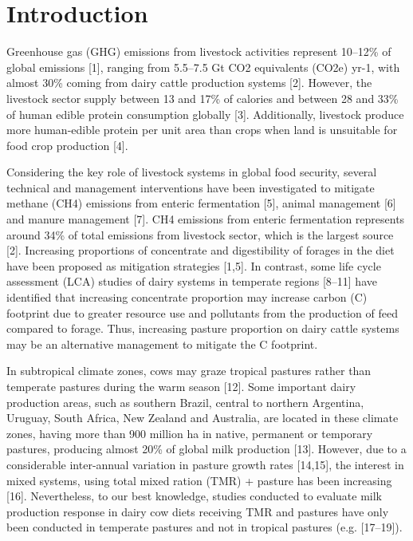 \documentclass[11pt,a4paper]{article}
\begin{document}
\section{Introduction}

Greenhouse gas (GHG) emissions from livestock activities represent 10–12\% of global emissions [1], ranging from 5.5–7.5 Gt CO2 equivalents (CO2e) yr-1, with almost 30\% coming from dairy cattle production systems [2]. However, the livestock sector supply between 13 and 17\% of calories and between 28 and 33\% of human edible protein consumption globally [3]. Additionally, livestock produce more human-edible protein per unit area than crops when land is unsuitable for food crop production [4].

Considering the key role of livestock systems in global food security, several technical and management interventions have been investigated to mitigate methane (CH4) emissions from enteric fermentation [5], animal management [6] and manure management [7]. CH4 emissions from enteric fermentation represents around 34\% of total emissions from livestock sector, which is the largest source [2]. Increasing proportions of concentrate and digestibility of forages in the diet have been proposed as mitigation strategies [1,5]. In contrast, some life cycle assessment (LCA) studies of dairy systems in temperate regions [8–11] have identified that increasing concentrate proportion may increase carbon (C) footprint due to greater resource use and pollutants from the production of feed compared to forage. Thus, increasing pasture proportion on dairy cattle systems may be an alternative management to mitigate the C footprint.

In subtropical climate zones, cows may graze tropical pastures rather than temperate pastures during the warm season [12]. Some important dairy production areas, such as southern Brazil, central to northern Argentina, Uruguay, South Africa, New Zealand and Australia, are located in these climate zones, having more than 900 million ha in native, permanent or temporary pastures, producing almost 20\% of global milk production [13]. However, due to a considerable inter-annual variation in pasture growth rates [14,15], the interest in mixed systems, using total mixed ration (TMR) + pasture has been increasing [16]. Nevertheless, to our best knowledge, studies conducted to evaluate milk production response in dairy cow diets receiving TMR and pastures have only been conducted in temperate pastures and not in tropical pastures (e.g. [17–19]).
\end{document}
